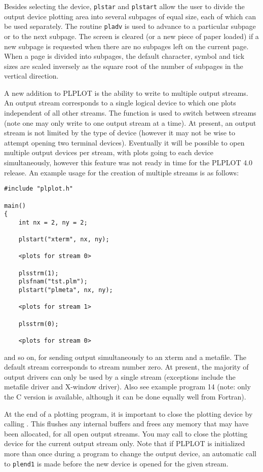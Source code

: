 Besides selecting the device, {\tt plstar} and {\tt plstart} allow the user
to divide the output device plotting area into several subpages of equal
size, each of which can be used separately. The routine {\tt pladv} is used
to advance to a particular subpage or to the next subpage. The screen is
cleared (or a new piece of paper loaded) if a new subpage is requested
when there are no subpages left on the current page.  When a page is
divided into subpages, the default character, symbol and tick sizes are
scaled inversely as the square root of the number of subpages in the
vertical direction. 

A new addition to PLPLOT is the ability to write to multiple output streams.
An output stream corresponds to a single logical device to which one
plots independent of all other streams.  The function 
is used to switch between streams (note one may only write to one output 
stream at a time).  At present, an output stream is not limited by the
type of device (however it may not be wise to attempt opening two terminal
devices).  Eventually it will be possible to open multiple output devices
per stream, with plots going to each device simultaneously, however this
feature was not ready in time for the PLPLOT 4.0 release.  An example
usage for the creation of multiple streams is as follows:

\begin{verbatim}
#include "plplot.h"

main()
{
    int nx = 2, ny = 2;

    plstart("xterm", nx, ny);

    <plots for stream 0>

    plsstrm(1);
    plsfnam("tst.plm");
    plstart("plmeta", nx, ny);

    <plots for stream 1>

    plsstrm(0);

    <plots for stream 0>
\end{verbatim}

and so on, for sending output simultaneously to an xterm and a metafile.
The default stream corresponds to stream number zero.  At present, the
majority of output drivers can only be used by a single stream (exceptions
include the metafile driver and X-window driver).  Also see example program
14 (note:  only the C version is available, although it can be done equally
well from Fortran).

At the end of a plotting program, it is important to close the plotting
device by calling . This flushes any internal buffers and frees
any memory that may have been allocated, for all open output streams.  You
may call  to close the plotting device for the current output
stream only.  Note that if PLPLOT is initialized more than once during a
program to change the output device, an automatic call to {\tt plend1} is
made before the new device is opened for the given stream.

